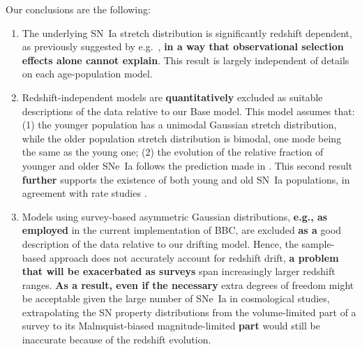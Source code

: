 \documentclass[referee]{aa}
\begin{document}
Our conclusions are the following:
\begin{enumerate}

    \item The underlying SN~Ia stretch distribution is significantly redshift
        dependent, as previously suggested by e.g.~\cite{howell2007}, \textbf{in
        a way that observational selection effects alone cannot explain}. This
        result is largely independent of details on each age-population model.
    
    \item Redshift-independent models are \textbf{quantitatively} excluded as
        suitable descriptions of the data relative to our Base model. This model
        assumes that: (1) the younger population has a unimodal Gaussian stretch
        distribution, while the older population stretch distribution is
        bimodal, one mode being the same as the young one; (2) the evolution of
        the relative fraction of younger and older SNe~Ia follows the prediction
        made in \cite{rigault2020}. This second result \textbf{further} supports
        the existence of both young and old SN~Ia populations, in agreement with
        rate studies \cite{mannucci2005, scannapieco2005, sullivan2006,
        aubourg2008}. 
        
    \item Models using survey-based asymmetric Gaussian distributions,
        \textbf{e.g., as employed} in the current implementation of BBC, are
        excluded \textbf{as a} good description of the data relative to our
        drifting model. Hence, the sample-based approach does not accurately
        account for redshift drift, \textbf{a problem that will be exacerbated
        as surveys} span increasingly larger redshift ranges. \textbf{As a
    result, even if the necessary} extra degrees of freedom might be acceptable
    given the large number of SNe~Ia in cosmological studies, extrapolating the
    SN property distributions from the volume-limited part of a survey to its
    Malmquist-biased magnitude-limited \textbf{part} would still be inaccurate
    because of the redshift evolution.


\end{enumerate}
\end{document}

